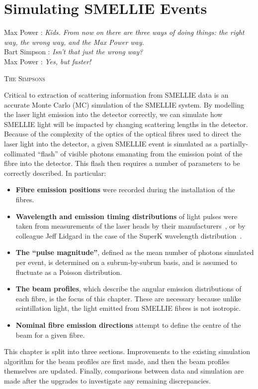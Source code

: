 \chapter{Simulating SMELLIE Events}\label{chap:beam_profiling}
\setlength{\epigraphwidth}{.5\textwidth}
\epigraph{Max Power : \textit{Kids. From now on there are three ways of doing things: the right way, the wrong way, and the Max Power way.}\\
Bart Simpson : \textit{Isn't that just the wrong way?}\\
Max Power : \textit{Yes, but faster!}}{\textsc{The Simpsons}}
\setlength{\epigraphwidth}{.4\textwidth}
Critical to extraction of scattering information from SMELLIE data is an accurate Monte Carlo (MC) simulation of the SMELLIE system. By modelling the laser light emission into the detector correctly, we can simulate how SMELLIE light will be impacted by changing scattering lengths in the detector. Because of the complexity of the optics of the optical fibres used to direct the laser light into the detector, a given SMELLIE event is simulated as a partially-collimated ``flash'' of visible photons emanating from the emission point of the fibre into the detector. This flash then requires a number of parameters to be correctly described. In particular:
\begin{itemize}
    \item \textbf{Fibre emission positions} were recorded during the installation of the fibres.
    \item \textbf{Wavelength and emission timing distributions} of light pulses were taken from measurements of the laser heads by their manufacturers~\cite{}, or by colleague Jeff Lidgard in the case of the SuperK wavelength distribution~\cite{}.
    \item \textbf{The ``pulse magnitude''}, defined as the mean number of photons simulated per event, is determined on a subrun-by-subrun basis, and is assumed to fluctuate as a Poisson distribution. 
    \item \textbf{The beam profiles}, which describe the angular emission distributions of each fibre, is the focus of this chapter. These are necessary because unlike scintillation light, the light emitted from SMELLIE fibres is not isotropic.
    \item \textbf{Nominal fibre emission directions} attempt to define the centre of the beam for a given fibre.
\end{itemize}

This chapter is split into three sections. Improvements to the existing simulation algorithm for the beam profiles are first made, and then the beam profiles themselves are updated. Finally, comparisons between data and simulation are made after the upgrades to investigate any remaining discrepancies.


